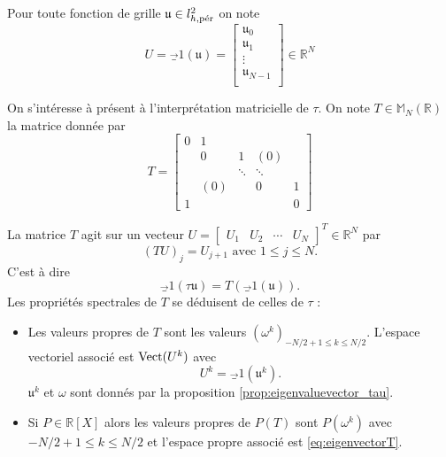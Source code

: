 Pour toute fonction de grille $\mathfrak{u} \in l^2_{h,\per}$ on note
\begin{equation}
U = \vec_1( \mathfrak{u} ) = \begin{bmatrix}
\mathfrak{u}_0\\
\mathfrak{u}_1\\
\vdots\\
\mathfrak{u}_{N-1}\\
\end{bmatrix} \in \mathbb{R}^N
\end{equation}

On s'intéresse à présent à l'interprétation matricielle de $\tau$. On note $T \in \mathbb{M}_N (\mathbb{R})$ la matrice donnée par
\begin{equation}
T = \begin{bmatrix}
0 & 1 &   &   &   \\ 
  & 0 & 1 & (0) &   \\ 
  &   & \ddots & \ddots &   \\ 
  & (0) &   & 0 & 1 \\ 
1 &   &   &   & 0
\end{bmatrix} 
\label{eq:matrice_translation}
\end{equation}

La matrice $T$ agit sur un vecteur $U = \begin{bmatrix}
U_1 & U_2 & \cdots & U_{N} 
\end{bmatrix}^T \in \mathbb{R}^N $ par
\begin{equation}
(TU)_j = U_{j+1} \text{ avec } 1 \leq j \leq N.
\end{equation}
C'est à dire
\begin{equation}
\vec_1 ( \tau \mathfrak{u} ) = T ( \vec_1 ( \mathfrak{u} ) ). 
\end{equation}
Les propriétés spectrales de $T$ se déduisent de celles de $\tau$ :
\begin{corollaire}
\begin{itemize}
\item Les valeurs propres de $T$ sont les valeurs $(\omega^k)_{-N/2+1 \leq k \leq N/2}$. 
L'espace vectoriel associé est $\Vect ( U^k )$ avec
\begin{equation}
U^k = \vec_1 (\mathfrak{u}^k ).
\label{eq:eigenvectorT}
\end{equation}
$\mathfrak{u}^k$ et $\omega$ sont donnés par la proposition \ref{prop:eigenvaluevector_tau}.

\item Si $P \in \mathbb{R}[X]$ alors les valeurs propres de $P(T)$ sont $P(\omega^k)$ avec $-N/2 + 1 \leq k \leq N/2$ et l'espace propre associé est \eqref{eq:eigenvectorT}.
\end{itemize}
\label{prop:eigen_P(T)}
\end{corollaire}

